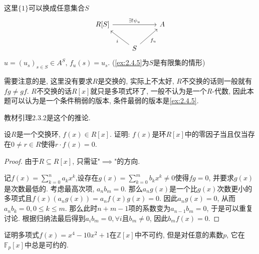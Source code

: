 \begin{remark}
    这里$\{1\}$可以换成任意集合$S$
    \[
        \begin{tikzcd}
        {R[S]} \arrow[rr, "\exists!\psi_u"] &                                      & A \\
                                            & S \arrow[lu, "i"] \arrow[ru, "f_u"'] &  
        \end{tikzcd}
    \]
    $u = (u_s)_{s \in S} \in A^S,\, f_u(s) = u_s$. (\ref{ex:2.4.5}为$S$是有限集的情形)

    需要注意的是, 这里没有要求$R$是交换的, 实际上不太好, $R$不交换的话则一般就有$fg \neq gf$. $R$不交换的话$R[x]$就只是多项式环了, 一般不认为是一个$R$-代数, 因此本题可以认为是一个条件稍弱的版本, 条件最弱的版本是\ref{ex:2.4.5}.

    教材引理2.3.2是这个的推论.
\end{remark}

\begin{problem}
    设$R$是一个交换环, $f(x) \in R[x]$. 证明: $f(x)$是环$R[x]$中的零因子当且仅当存在$0 \neq r \in R$使得$r \cdot f(x) = 0$.
\end{problem}

\begin{proof}
    由于$R \subseteq R[x]$, 只需证"$\implies$"的方向.

    记$f(x) = \sum_{k = 0}^{n} a_kx^k$,设存在$g(x) = \sum_{k = 0}^{m} b_kx^k \neq 0$使得$fg = 0$, 并要求$g(x)$是次数最低的. 考虑最高次项, $a_nb_m = 0$. 那么$a_ng(x)$是一个比$g(x)$次数更小的多项式且$f(x)(a_ng(x)) = a_nf(x)g(x) = 0$. 因此$a_ng(x) = 0$, 从而$a_nb_k = 0, 0 \leqslant k \leqslant m$. 那么此时$n + m - 1$项的系数变为$a_{n - 1}b_m = 0$, 于是可以重复讨论. 根据归纳法最后得到$a_ib_m = 0, \forall i$且$b_m \neq 0$, 因此$b_mf(x) = 0$.
\end{proof}

\begin{problem}
    证明多项式$f(x) = x^4 - 10x^2 + 1$在$\mathbb{Z}[x]$中不可约, 但是对任意的素数$p$, 它在$\mathbb{F}_p[x]$中总是可约的.
\end{problem}

